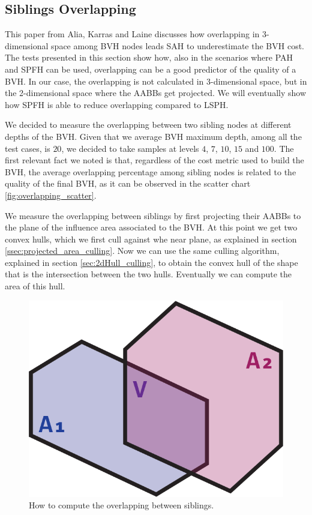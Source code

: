 \documentclass{PoliMi_MasterThesis}
\begin{document}
\subsection{Siblings Overlapping} \label{ssec:siblings_overlapping}
This paper \cite{bvh_overlapping_metric} from Alia, Karras and Laine discusses how overlapping in 3-dimensional space among BVH nodes leads SAH to underestimate the BVH cost. The tests presented in this section show how, also in the scenarios where PAH and SPFH can be used, overlapping can be a good predictor of the quality of a BVH. In our case, the overlapping is not calculated in 3-dimensional space, but in the 2-dimensional space where the AABBs get projected. We will eventually show how SPFH is able to reduce overlapping compared to LSPH.

We decided to measure the overlapping between two sibling nodes at different depths of the BVH. Given that we average BVH maximum depth, among all the test cases, is $20$, we decided to take samples at levels $4$, $7$, $10$, $15$ and $100$. The first relevant fact we noted is that, regardless of the cost metric used to build the BVH, the average overlapping percentage among sibling nodes is related to the quality of the final BVH, as it can be observed in the scatter chart \ref{fig:overlapping_scatter}.

We measure the overlapping between siblings by first projecting their AABBs to the plane of the influence area associated to the BVH. At this point we get two convex hulls, which we first cull against whe near plane, as explained in section \ref{ssec:projected_area_culling}. Now we can use the same culling algorithm, explained in section \ref{sec:2dHull_culling}, to obtain the convex hull of the shape that is the intersection between the two hulls. Eventually we can compute the area of this hull. 

\begin{figure}[H] 
	\centering
	\includegraphics[width=\textwidth*\real{0.25}]{Images/overlapping.png}
	\caption{How to compute the overlapping between siblings.}
	\label{fig:pah_overlapping_siblings}
\end{figure}
\end{document}
